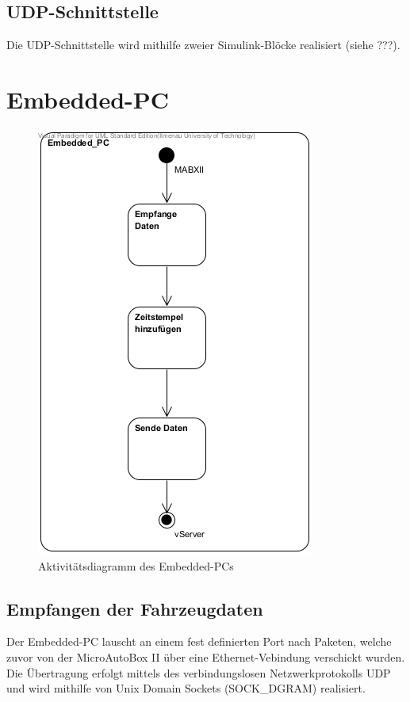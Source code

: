 \documentclass[fontsize = 12pt, paper = a4]{scrreprt}
\begin{document}
\subsection{UDP-Schnittstelle} 

Die UDP-Schnittstelle wird mithilfe zweier Simulink-Blöcke realisiert (siehe ???). 

\section{Embedded-PC}

\begin{figure}[h]
\centering
\includegraphics[scale = 0.70]{activity_embedded_pc.png}
\caption[Aktivitätsdiagramm Embedded-PC]{Aktivitätsdiagramm des Embedded-PCs}
\end{figure} 

\subsection{Empfangen der Fahrzeugdaten}

Der Embedded-PC lauscht an einem fest definierten Port nach Paketen, welche zuvor von der MicroAutoBox II über eine Ethernet-Vebindung verschickt wurden. Die Übertragung erfolgt mittels des verbindungslosen Netzwerkprotokolls UDP und wird mithilfe von Unix Domain Sockets (SOCK\_DGRAM) realisiert. 
\end{document}
